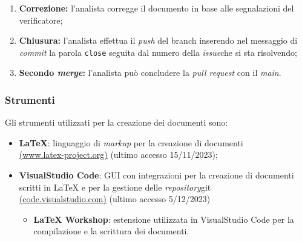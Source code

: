 \begin{itemize}
\begin{enumerate}
		      \item \textbf{Correzione:} l'analista corregge il documento
		            in base alle segnalazioni del verificatore;

		      \item \textbf{Chiusura:} l'analista effettua il \textit{push} del
		            branch inserendo nel messaggio di \textit{commit} la parola
		            \texttt{close} seguita dal numero della \textit{issue}\g che si sta
		            risolvendo;

		      \item \textbf{Secondo \textit{merge}:} l'analista può concludere la
		            \textit{pull request} con il \textit{main}.
	      \end{enumerate}
\end{itemize}

\subsubsection{Strumenti}
Gli strumenti utilizzati per la creazione dei documenti sono:
\begin{itemize}
	\item \textbf{LaTeX}: linguaggio di \textit{markup} per la creazione di documenti \\
	      \href{https://www.latex-project.org/}{(www.latex-project.org)} (ultimo accesso 15/11/2023);
	\item \textbf{VisualStudio Code}: GUI con integrazioni per la creazione di documenti scritti in LaTeX e per la gestione delle \textit{repository}\g git\g \\
	      \href{https://code.visualstudio.com/}{(code.visualstudio.com)} (ultimo accesso 5/12/2023)
	      \begin{itemize}
		      \item \textbf{LaTeX Workshop}: estensione utilizzata in VisualStudio Code per la compilazione e la scrittura dei documenti.
	      \end{itemize}
\end{itemize}

